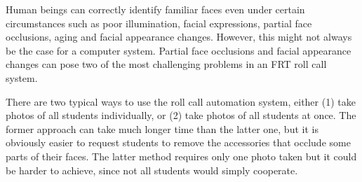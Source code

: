 Human beings can correctly identify familiar faces even under certain circumstances such as poor illumination,
facial expressions, partial face occlusions, aging and facial appearance changes. However, this might not always
be the case for a computer system. Partial face occlusions and facial appearance changes can pose two of the most
challenging problems in an FRT roll call system.
\vspace{0.3cm}

There are two typical ways to use the roll call automation system, either (1) take photos of all students individually,
or (2) take photos of all students at once. The former approach can take much longer time than the latter one, but it
is obviously easier to request students to remove the accessories that occlude some parts of their faces. The latter
method requires only one photo taken but it could be harder to achieve, since not all students would simply cooperate.
